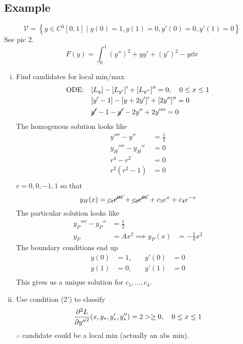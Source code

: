 \documentclass[12pt,twoside]{article}
\begin{document}
\subsection{Example}
\begin{equation*}
  \mathcal{V} = \left\{ y\in C^4[0,1]\;|\;y(0)=1,y(1)=0,y'(0)=0,y'(1)=0 \right\}
\end{equation*}
See pic 2.
\begin{equation*}
  F(y)=\int_0^1 {(y'')}^2 + yy' + {(y')}^2 - y \dd{x}
\end{equation*}
\begin{enumerate}[(i)]
\item Find candidates for local min/max
  \begin{equation*}
    \begin{aligned}
      \text{ODE:}\quad& [L_y] - [L_{y'}]' + [L_{y''}]'' = 0,\quad 0\le x \le 1 \\
      &[y'-1] - [y+2y']' + [2y'']'' = 0 \\
      &\cancel{y'}-1-\cancel{y'}-2y''+2y''''=0
    \end{aligned}
  \end{equation*}
The homogenous solution looks like
  \begin{equation*}
    \begin{aligned}
      y'''' - y'' &= \frac{1}{2} \\
      y_H'''' - y_H'' &= 0 \\
      r^4 - r^2 &= 0 \\
      r^2(r^2-1) &= 0 \\
    \end{aligned}
  \end{equation*}
$r=0,0,-1,1$ so that
\begin{equation*}
  y_H(x) = \cancel{c_1e^{0x}} + \cancel{c_2e^{0x}} + c_3e^x + c_4e^{-x}
\end{equation*}
The particular solution looks like
\begin{equation*}
  \begin{aligned}
    y_P'''' - y_P'' &= \frac{1}{2} \\
    y_P &= Ax^2
    \implies y_P(x) &= -\frac{1}{4}x^2
  \end{aligned}
\end{equation*}
The boundary conditions end up
\begin{equation*}
  \begin{aligned}
    y(0)&=1, &\quad y'(0)&= 0 \\
    y(1)&=0, &\quad y'(1)&= 0 \\
  \end{aligned}
\end{equation*}
This gives us a unique solution for $c_1,\ldots,c_4$.
\item
Use condition (2') to classify
\begin{equation*}
  \pd[2]{L}{y''}(x,y_*,y_*',y_*'') = 2 > \ge 0,\quad 0\le x \le 1
\end{equation*}
$\therefore$ candidate could be a local min (actually an abs min).
\end{enumerate}
\end{document}
